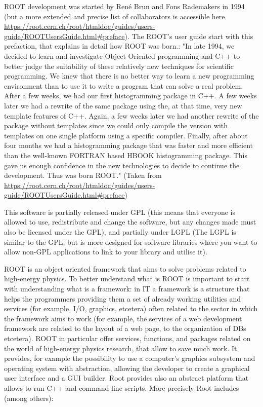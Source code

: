 ROOT development was started by René Brun and Fons Rademakers in 1994 (but a more extended and precise list of collaborators is accessible here \url{https://root.cern.ch/root/htmldoc/guides/users-guide/ROOTUsersGuide.html#preface}). 
The ROOT's user guide start with this prefaction, that explains in detail how ROOT was born.:
"In late 1994, we decided to learn and investigate Object Oriented programming and C++ to better judge the suitability of these relatively new techniques for scientific programming. We knew that there is no better way to learn a new programming environment than to use it to write a program that can solve a real problem. After a few weeks, we had our first histogramming package in C++. A few weeks later we had a rewrite of the same package using the, at that time, very new template features of C++. Again, a few weeks later we had another rewrite of the package without templates since we could only compile the version with templates on one single platform using a specific compiler. Finally, after about four months we had a histogramming package that was faster and more efficient than the well-known FORTRAN based HBOOK histogramming package. This gave us enough confidence in the new technologies to decide to continue the development. Thus was born ROOT."
(Taken from \url{https://root.cern.ch/root/htmldoc/guides/users-guide/ROOTUsersGuide.html#preface})


This software is partially released under GPL (this means that everyone is allowed to use, redistribute and change the software, but any changes made must also be licensed under the GPL), and partially under LGPL (The LGPL is similar to the GPL, but is more designed for software libraries where you want to allow non-GPL applications to link to your library and utilise it).

ROOT is an object oriented framework that aims to solve problems related to high-energy physics. To better understand what is ROOT is important to start with understanding what is a framework: in IT a framework is a structure that helps the programmers providing them a set of already working utilities and services (for example, I/O, graphics, etcetera) often related to the sector in which the framework aims to work (for example, the services of a web development framework are related to the layout of a web page, to the organization of DBs etcetera). ROOT in particular offer services, functions, and packages related on the world of high-energy physics research, that allow to save much work.
It provides, for example the possibility to use a computer's graphics subsystem and operating system with abstraction, allowing the developer to create a graphical user interface and a GUI builder. Root provides also an abstract platform that allows to run C++ and command line scripts. More precisely Root includes (among others):

